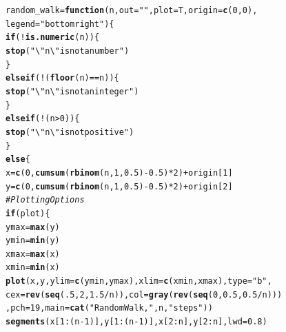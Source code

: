 \documentclass{llncs}\usepackage[]{graphicx}\usepackage[]{color}
\makeatletter
\newcommand{\hlnum}[1]{\textcolor[rgb]{0.686,0.059,0.569}{#1}}%
\newcommand{\hlstr}[1]{\textcolor[rgb]{0.192,0.494,0.8}{#1}}%
\newcommand{\hlcom}[1]{\textcolor[rgb]{0.678,0.584,0.686}{\textit{#1}}}%
\newcommand{\hlopt}[1]{\textcolor[rgb]{0,0,0}{#1}}%
\newcommand{\hlstd}[1]{\textcolor[rgb]{0.345,0.345,0.345}{#1}}%
\newcommand{\hlkwa}[1]{\textcolor[rgb]{0.161,0.373,0.58}{\textbf{#1}}}%
\newcommand{\hlkwb}[1]{\textcolor[rgb]{0.69,0.353,0.396}{#1}}%
\newcommand{\hlkwc}[1]{\textcolor[rgb]{0.333,0.667,0.333}{#1}}%
\newcommand{\hlkwd}[1]{\textcolor[rgb]{0.737,0.353,0.396}{\textbf{#1}}}%
\newenvironment{kframe}{%
 \def\at@end@of@kframe{}%
 \ifinner\ifhmode%
  \def\at@end@of@kframe{\end{minipage}}%
  \begin{minipage}{\columnwidth}%
 \fi\fi%
 \def\FrameCommand##1{\hskip\@totalleftmargin \hskip-\fboxsep
 \colorbox{shadecolor}{##1}\hskip-\fboxsep
     \hskip-\linewidth \hskip-\@totalleftmargin \hskip\columnwidth}%
 \MakeFramed {\advance\hsize-\width
   \@totalleftmargin\z@ \linewidth\hsize
   \@setminipage}}%
 {\par\unskip\endMakeFramed%
 \at@end@of@kframe}
\newenvironment{knitrout}{}{} %
\makeatother
\begin{document}
\begin{knitrout}
\color{fgcolor}\begin{kframe}
\begin{alltt}
\hlstd{random_walk} \hlkwb{=} \hlkwa{function} \hlstd{(}\hlkwc{n}\hlstd{,}\hlkwc{out}\hlstd{=}\hlstr{""}\hlstd{,}\hlkwc{plot}\hlstd{=T,}\hlkwc{origin}\hlstd{=}\hlkwd{c}\hlstd{(}\hlnum{0}\hlstd{,}\hlnum{0}\hlstd{),}
                        \hlkwc{legend}\hlstd{=}\hlstr{"bottomright"}\hlstd{)\{}
  \hlkwa{if} \hlstd{(}\hlopt{!}\hlkwd{is.numeric}\hlstd{(n))\{}
    \hlkwd{stop}\hlstd{(}\hlstr{"\textbackslash{}"n\textbackslash{}" is not a number"}\hlstd{)}
  \hlstd{\}}
  \hlkwa{else if} \hlstd{(}\hlopt{!}\hlstd{(}\hlkwd{floor}\hlstd{(n)}\hlopt{==}\hlstd{n))\{}
    \hlkwd{stop}\hlstd{(}\hlstr{"\textbackslash{}"n\textbackslash{}" is not an integer"}\hlstd{)}
  \hlstd{\}}
  \hlkwa{else if} \hlstd{(}\hlopt{!}\hlstd{(n}\hlopt{>}\hlnum{0}\hlstd{))\{}
    \hlkwd{stop}\hlstd{(}\hlstr{"\textbackslash{}"n\textbackslash{}" is not positive"}\hlstd{)}
  \hlstd{\}}
  \hlkwa{else}\hlstd{\{}
    \hlstd{x}\hlkwb{=}\hlkwd{c}\hlstd{(}\hlnum{0}\hlstd{,}\hlkwd{cumsum}\hlstd{(}\hlkwd{rbinom}\hlstd{(n,}\hlnum{1}\hlstd{,}\hlnum{0.5}\hlstd{)}\hlopt{-}\hlnum{0.5}\hlstd{)}\hlopt{*}\hlnum{2}\hlstd{)}\hlopt{+}\hlstd{origin[}\hlnum{1}\hlstd{]}
    \hlstd{y}\hlkwb{=}\hlkwd{c}\hlstd{(}\hlnum{0}\hlstd{,}\hlkwd{cumsum}\hlstd{(}\hlkwd{rbinom}\hlstd{(n,}\hlnum{1}\hlstd{,}\hlnum{0.5}\hlstd{)}\hlopt{-}\hlnum{0.5}\hlstd{)}\hlopt{*}\hlnum{2}\hlstd{)}\hlopt{+}\hlstd{origin[}\hlnum{2}\hlstd{]}
    \hlcom{#Plotting Options}
    \hlkwa{if} \hlstd{(plot)\{}
      \hlstd{ymax}\hlkwb{=}\hlkwd{max}\hlstd{(y)}
      \hlstd{ymin}\hlkwb{=}\hlkwd{min}\hlstd{(y)}
      \hlstd{xmax}\hlkwb{=}\hlkwd{max}\hlstd{(x)}
      \hlstd{xmin}\hlkwb{=}\hlkwd{min}\hlstd{(x)}
      \hlkwd{plot}\hlstd{(x,y,}\hlkwc{ylim}\hlstd{=}\hlkwd{c}\hlstd{(ymin,ymax),}\hlkwc{xlim}\hlstd{=}\hlkwd{c}\hlstd{(xmin,xmax),}\hlkwc{type}\hlstd{=}\hlstr{"b"}\hlstd{,}
           \hlkwc{cex}\hlstd{=}\hlkwd{rev}\hlstd{(}\hlkwd{seq}\hlstd{(}\hlnum{.5}\hlstd{,}\hlnum{2}\hlstd{,}\hlnum{1.5}\hlopt{/}\hlstd{n)),}\hlkwc{col}\hlstd{=}\hlkwd{gray}\hlstd{(}\hlkwd{rev}\hlstd{(}\hlkwd{seq}\hlstd{(}\hlnum{0}\hlstd{,}\hlnum{0.5}\hlstd{,}\hlnum{0.5}\hlopt{/}\hlstd{n)))}
           \hlstd{,}\hlkwc{pch}\hlstd{=}\hlnum{19}\hlstd{,}\hlkwc{main}\hlstd{=}\hlkwd{cat}\hlstd{(}\hlstr{"Random Walk, "}\hlstd{, n,} \hlstr{" steps"}\hlstd{))}
      \hlkwd{segments}\hlstd{(x[}\hlnum{1}\hlopt{:}\hlstd{(n}\hlopt{-}\hlnum{1}\hlstd{)],y[}\hlnum{1}\hlopt{:}\hlstd{(n}\hlopt{-}\hlnum{1}\hlstd{)],x[}\hlnum{2}\hlopt{:}\hlstd{n],y[}\hlnum{2}\hlopt{:}\hlstd{n],}\hlkwc{lwd}\hlstd{=}\hlnum{0.8}\hlstd{)}

\end{alltt}
\end{kframe}
\end{knitrout}
\end{document}
